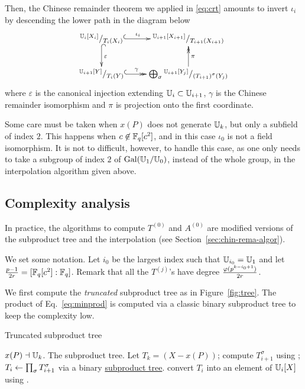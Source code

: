 Then, the Chinese remainder theorem we applied in \eqref{eq:crt}
amounts to invert $\iota_i$ by descending the lower path in the
diagram below
\begin{equation}
  \xymatrix{
    ^{\U_i[X_i]}/_{T_i(X_i)} \ar@{^{(}->}[r]^-{\iota_i} \ar@{^{(}->}[d]^{\varepsilon} &
    ^{\U_{i+1}[X_{i+1}]}/_{T_{i+1}(X_{i+1})} \\
    ^{\U_{i+1}[Y]}/_{T_i(Y)} \ar@{^{(}->>}[r]^-{\gamma} &
    \bigoplus_\sigma {}^{\U_{i+1}[Y_{j}]}/_{\left(T_{i+1}\right)^\sigma(Y_{j})} \ar@{->>}[u]_{\pi}
  }
\end{equation}
where $\varepsilon$ is the canonical injection extending
$\mathbb{U}_i\subset\mathbb{U}_{i+1}$, $\gamma$ is the Chinese remainder isomorphism
and $\pi$ is projection onto the first coordinate.

Some care must be taken when $x(P)$ does not generate $\mathbb{U}_k$, but only
a subfield of index $2$. This happens when $c\not\in\mathbb{F}_q[c^2]$, and in
this case $\iota_0$ is not a field isomorphism. It is not to
difficult, however, to handle this case, as one only needs to take a
subgroup of index $2$ of $\operatorname{Gal}(\mathbb{U}_1/\mathbb{U}_0)$, instead of the whole
group, in the interpolation algorithm given above.


\subsection{Complexity analysis}
\label{sec:C2-AS-FI:complexity}

In practice, the algorithms to compute $T^{(0)}$ and $A^{(0)}$ are
modified versions of the subproduct tree and the interpolation (see
Section~\ref{sec:chin-rema-algor}).

We set some notation. Let $i_0$ be the largest index such that
$\mathbb{U}_{i_0} = \mathbb{U}_1$ and let $\frac{p-1}{2r} = [\mathbb{F}_q[c^2]:\mathbb{F}_q]$.  Remark
that all the $T^{(j)}$'s have degree $\frac{\varphi(p^{k-i_0+1})}{2r}$.

We first compute the \emph{truncated} subproduct tree as in
Figure~\ref{fig:tree}. The product of Eq.~\eqref{eq:minprod} is
computed via a classic binary subproduct tree to keep the complexity
low.

\begin{algorithm}
  \caption{Truncated subproduct tree}
  \begin{algorithmic}[1]
    \REQUIRE $x(P)\dashv\mathbb{U}_k$.
    \ENSURE The subproduct tree.
    \STATE Let $T_k = (X - x(P))$;
    \STATE\label{alg:T:gal} compute $T_{i+1}^\sigma$  using ;
    \ENDFOR
    \STATE\label{alg:T:prod}  $T_i\leftarrow\prod_\sigma T_{i+1}^\sigma$ 
    via a binary \hyperref[sec:chin-rema-algor]{subproduct tree}.
    \STATE\label{alg:T:push} convert $T_i$  into an element of
    $\mathbb{U}_i[X]$ using .
    \ENDFOR
  \end{algorithmic}
\end{algorithm}


